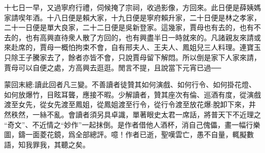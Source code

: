 \begin{parag}
    十七日一早，又過寧府行禮，伺候掩了宗祠，收過影像，方回來。此日便是薛姨媽家請喫年酒。十八日便是賴大家，十九日便是寧府賴升家，二十日便是林之孝家，二十一日便是單大良家，二十二日便是吳新登家。這幾家，賈母也有去的，也有不去的，也有高興直待衆人散了方回的，也有興盡半日一時就來的。凡諸親友來請或來赴席的，賈母一概怕拘束不會，自有邢夫人、王夫人、鳳姐兒三人料理。連寶玉只除王子騰家去了，餘者亦皆不會，只說賈母留下解悶。所以倒是家下人家來請，賈母可以自便之處，方高興去逛逛。閒言不提，且說當下元宵已過──
\end{parag}


\begin{parag}
    \begin{note}蒙回末總:讀此回者凡三變。不善讀者徒贊其如何演戲、如何行令、如何掛花燈、如何放爆竹，目眩耳聾，應接不暇。少解讀者，贊其座次有倫、巡酒有度，從演戲渡至女先，從女先渡至鳳姐，從鳳姐渡至行令，從行令渡至放花爆:脫卸下來，井然秩然，一絲不亂。會讀者須另具卓識，單著眼史太君一席話，將普天下不近理之 “奇文”、不近情之“妙作”一起抹倒。是作者借他人酒杯，消自己傀儡，畫一幅行樂圖，鑄一面菱花鏡，爲全部總評。噫！作者已逝，聖嘆雲亡，愚不自量，輒擬數語，知我罪我，其聽之矣。\end{note}
\end{parag}
